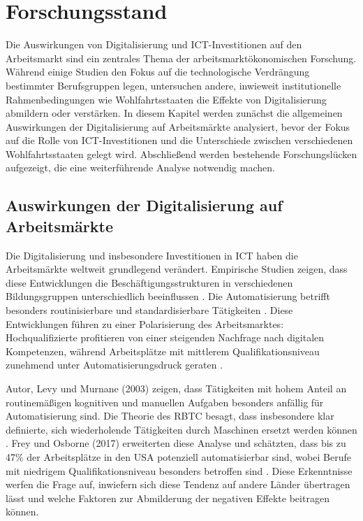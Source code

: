 
\section{Forschungsstand}

Die Auswirkungen von Digitalisierung und \ac{ICT}-Investitionen auf den Arbeitsmarkt sind
ein zentrales Thema der arbeitsmarktökonomischen Forschung. Während einige Studien den
Fokus auf die technologische Verdrängung bestimmter Berufsgruppen legen, untersuchen
andere, inwieweit institutionelle Rahmenbedingungen wie Wohlfahrtsstaaten die Effekte von
Digitalisierung abmildern oder verstärken. In diesem Kapitel werden zunächst die
allgemeinen Auswirkungen der Digitalisierung auf Arbeitsmärkte analysiert, bevor der Fokus
auf die Rolle von \ac{ICT}-Investitionen und die Unterschiede zwischen verschiedenen
Wohlfahrtsstaaten gelegt wird. Abschließend werden bestehende Forschungslücken aufgezeigt,
die eine weiterführende Analyse notwendig machen.


\subsection{Auswirkungen der Digitalisierung auf Arbeitsmärkte}

Die Digitalisierung und insbesondere Investitionen in \ac{ICT} haben die Arbeitsmärkte
weltweit grundlegend verändert. Empirische Studien zeigen, dass diese Entwicklungen die
Beschäftigungsstrukturen in verschiedenen Bildungsgruppen unterschiedlich beeinflussen
\parencite[vgl.][S. 7]{autor2013thegrowth}. Die Automatisierung betrifft besonders
routinisierbare und standardisierbare Tätigkeiten 
\parencite[vgl.][S. 20]{frey2013thefuture}. Diese Entwicklungen führen zu einer 
Polarisierung des Arbeitsmarktes: Hochqualifizierte profitieren von einer steigenden 
Nachfrage nach digitalen Kompetenzen, während Arbeitsplätze mit mittlerem 
Qualifikationsniveau zunehmend unter Automatisierungsdruck geraten
\parencite[vgl.][S. 2509]{goos2014explaining}.

Autor, Levy und Murnane (2003) zeigen, dass Tätigkeiten mit hohem Anteil an routinemäßigen
kognitiven und manuellen Aufgaben besonders anfällig für Automatisierung sind. Die Theorie
des \ac{RBTC} besagt, dass insbesondere klar definierte, sich wiederholende Tätigkeiten 
durch Maschinen ersetzt werden können \parencite[vgl.][S. 1281]{autor2003theskill}. Frey 
und Osborne (2017) erweiterten diese Analyse und schätzten, dass bis zu 47\% der 
Arbeitsplätze in den USA potenziell automatisierbar sind, wobei Berufe mit niedrigem 
Qualifikationsniveau besonders betroffen sind \parencite[vgl.][S. 254]{frey2013thefuture}. 
Diese Erkenntnisse  werfen die Frage auf, inwiefern sich diese Tendenz auf andere Länder 
übertragen lässt und welche Faktoren zur Abmilderung der negativen Effekte beitragen 
können.

